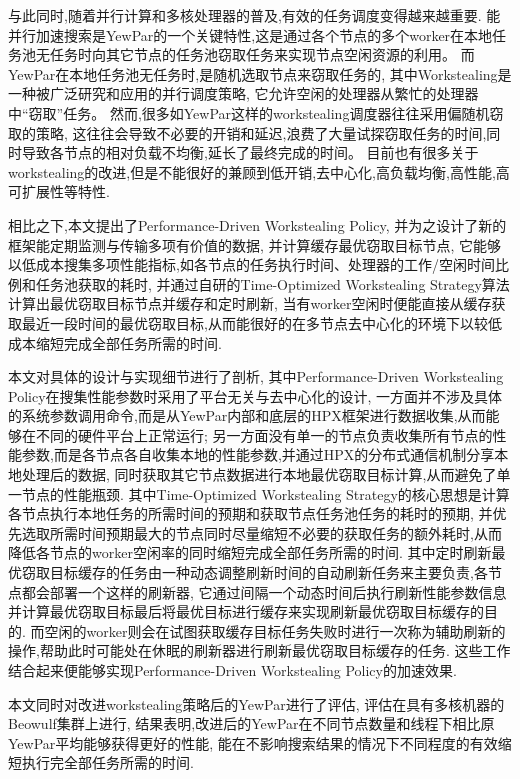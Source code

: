 \documentclass{mproj}
\begin{document}
与此同时,随着并行计算和多核处理器的普及,有效的任务调度变得越来越重要.
能并行加速搜索是YewPar的一个关键特性,这是通过各个节点的多个worker在本地任务池无任务时向其它节点的任务池窃取任务来实现节点空闲资源的利用。
而YewPar在本地任务池无任务时,是随机选取节点来窃取任务的,
其中Workstealing是一种被广泛研究和应用的并行调度策略,
它允许空闲的处理器从繁忙的处理器中“窃取”任务。
然而,很多如YewPar这样的workstealing调度器往往采用偏随机窃取的策略,
这往往会导致不必要的开销和延迟,浪费了大量试探窃取任务的时间,同时导致各节点的相对负载不均衡,延长了最终完成的时间。
目前也有很多关于workstealing的改进,但是不能很好的兼顾到低开销,去中心化,高负载均衡,高性能,高可扩展性等特性.


相比之下,本文提出了Performance-Driven Workstealing Policy,
并为之设计了新的框架能定期监测与传输多项有价值的数据,
并计算缓存最优窃取目标节点,
它能够以低成本搜集多项性能指标,如各节点的任务执行时间、处理器的工作/空闲时间比例和任务池获取的耗时,
并通过自研的Time-Optimized Workstealing Strategy算法计算出最优窃取目标节点并缓存和定时刷新,
当有worker空闲时便能直接从缓存获取最近一段时间的最优窃取目标,从而能很好的在多节点去中心化的环境下以较低成本缩短完成全部任务所需的时间.


本文对具体的设计与实现细节进行了剖析,
其中Performance-Driven Workstealing Policy在搜集性能参数时采用了平台无关与去中心化的设计,
一方面并不涉及具体的系统参数调用命令,而是从YewPar内部和底层的HPX\cite{10.1145/2676870.2676883}框架进行数据收集,从而能够在不同的硬件平台上正常运行;
另一方面没有单一的节点负责收集所有节点的性能参数,而是各节点各自收集本地的性能参数,并通过HPX的分布式通信机制分享本地处理后的数据,
同时获取其它节点数据进行本地最优窃取目标计算,从而避免了单一节点的性能瓶颈.
其中Time-Optimized Workstealing Strategy的核心思想是计算各节点执行本地任务的所需时间的预期和获取节点任务池任务的耗时的预期,
并优先选取所需时间预期最大的节点同时尽量缩短不必要的获取任务的额外耗时,从而降低各节点的worker空闲率的同时缩短完成全部任务所需的时间.
其中定时刷新最优窃取目标缓存的任务由一种动态调整刷新时间的自动刷新任务来主要负责,各节点都会部署一个这样的刷新器,
它通过间隔一个动态时间后执行刷新性能参数信息并计算最优窃取目标最后将最优目标进行缓存来实现刷新最优窃取目标缓存的目的.
而空闲的worker则会在试图获取缓存目标任务失败时进行一次称为辅助刷新的操作,帮助此时可能处在休眠的刷新器进行刷新最优窃取目标缓存的任务.
这些工作结合起来便能够实现Performance-Driven Workstealing Policy的加速效果.


本文同时对改进workstealing策略后的YewPar进行了评估,
评估在具有多核机器的Beowulf集群上进行,
结果表明,改进后的YewPar在不同节点数量和线程下相比原YewPar平均能够获得更好的性能,
能在不影响搜索结果的情况下不同程度的有效缩短执行完全部任务所需的时间.
\end{document}
